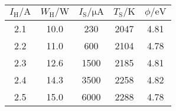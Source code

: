 \label{tab:tabSTA}
	\begin{tabular}{S[table-format=1.1]S[table-format=2.1]S[table-format=4.0]S[table-format=3.0]S[table-format=1.2]}
		\toprule
		{$I_\text{H}/\si{\ampere}$} & {$W_\text{H}/\si{\watt}$} & {$I_\text{S}/\si{\micro\ampere}$} & {$T_\text{S}/\si{\kelvin}$} & {$\phi/\si{\electronvolt}$} \\
		 & 10.0 &  230 & 2047 & 4.81 \\
		2.2 & 11.0 &  600 & 2104 & 4.78 \\
		2.3 & 12.6 & 1500 & 2185 & 4.81 \\
		2.4 & 14.3 & 3500 & 2258 & 4.82 \\
		2.5 & 15.0 & 6000 & 2288 & 4.78 \\
		\bottomrule
	\end{tabular}

